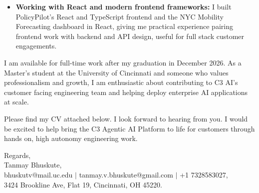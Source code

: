 \documentclass[11pt]{letter}
\begin{document}
\begin{letter}{}
\begin{itemize}[leftmargin=*, itemsep=0.45em]
    \item \textbf{Working with React and modern frontend frameworks:} I built PolicyPilot's React and TypeScript frontend and the NYC Mobility Forecasting dashboard in React, giving me practical experience pairing frontend work with backend and API design, useful for full stack customer engagements.
\end{itemize}

I am available for full-time work after my graduation in December 2026. As a Master's student at the University of Cincinnati and someone who values professionalism and growth, I am enthusiastic about contributing to C3 AI's customer facing engineering team and helping deploy enterprise AI applications at scale.

Please find my CV attached below. I look forward to hearing from you. I would be excited to help bring the C3 Agentic AI Platform to life for customers through hands on, high autonomy engineering work.

{\setlength{\parskip}{0pt}
Regards,\\
Tanmay Bhuskute,\\
bhuskutv@mail.uc.edu $\mid$ tanmay.v.bhuskute@gmail.com $\mid$ +1 7328583027,\\
3424 Brookline Ave, Flat 19, Cincinnati, OH 45220.
}

\end{letter}
\end{document}
